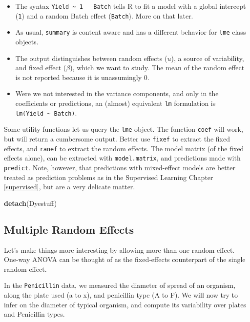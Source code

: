 \documentclass[]{book}
\newenvironment{Shaded}{\begin{snugshade}}{\end{snugshade}}
\newcommand{\KeywordTok}[1]{\textcolor[rgb]{0.13,0.29,0.53}{\textbf{#1}}}
\newcommand{\NormalTok}[1]{#1}
\providecommand{\tightlist}{%
  \setlength{\itemsep}{0pt}\setlength{\parskip}{0pt}}
\theoremstyle{definition}
\theoremstyle{definition}
\theoremstyle{definition}
\theoremstyle{remark}
\begin{document}
\begin{itemize}
\tightlist
\item
  The syntax \texttt{Yield\ \textasciitilde{}\ 1\ \ \textbar{}\ Batch}
  tells R to fit a model with a global intercept (\texttt{1}) and a
  random Batch effect (\texttt{\textbar{}Batch}). More on that later.
\item
  As usual, \texttt{summary} is content aware and has a different
  behavior for \texttt{lme} class objects.
\item
  The output distinguishes between random effects (\(u\)), a source of
  variability, and fixed effect (\(\beta\)), which we want to study. The
  mean of the random effect is not reported because it is unassumingly
  0.
\item
  Were we not interested in the variance components, and only in the
  coefficients or predictions, an (almost) equivalent \texttt{lm}
  formulation is \texttt{lm(Yield\ \textasciitilde{}\ Batch)}.
\end{itemize}

Some utility functions let us query the \texttt{lme} object. The
function \texttt{coef} will work, but will return a cumbersome output.
Better use \texttt{fixef} to extract the fixed effects, and
\texttt{ranef} to extract the random effects. The model matrix (of the
fixed effects alone), can be extracted with \texttt{model.matrix}, and
predictions made with \texttt{predict}. Note, however, that predictions
with mixed-effect models are better treated as prediction problems as in
the Supervised Learning Chapter \ref{supervised}, but are a very
delicate matter.

\begin{Shaded}
\begin{Highlighting}[]
\KeywordTok{detach}\NormalTok{(Dyestuff)}
\end{Highlighting}
\end{Shaded}

\subsection{Multiple Random Effects}\label{multiple-random-effects}

Let's make things more interesting by allowing more than one random
effect. One-way ANOVA can be thought of as the fixed-effects counterpart
of the single random effect.

In the \texttt{Penicillin} data, we measured the diameter of spread of
an organism, along the plate used (a to x), and penicillin type (A to
F). We will now try to infer on the diameter of typical organism, and
compute its variability over plates and Penicillin types.
\end{document}
